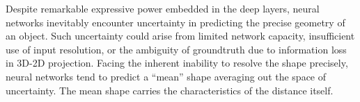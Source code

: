 \documentclass[10pt,twocolumn,letterpaper]{article}
\begin{document}
Despite remarkable expressive power embedded in the deep layers, neural networks inevitably encounter uncertainty in predicting the precise geometry of an object. Such uncertainty could arise from limited network capacity, insufficient use of input resolution, or the ambiguity of groundtruth due to information loss in 3D-2D projection. Facing the inherent inability to resolve the shape precisely, neural networks tend to predict a ``mean'' shape averaging out the space of uncertainty. The mean shape carries the characteristics of the distance itself.
\end{document}
